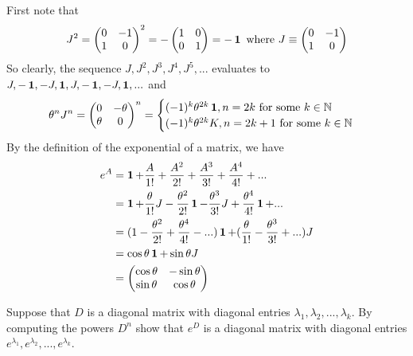 \documentclass[11pt,onecolumn]{article}
\begin{document}
\begin{answer}
First note that 
$$ J^2 = \begin{pmatrix} 0 & -1 \\ 1 & 0  \end{pmatrix}^2 = - \begin{pmatrix} 1 & 0 \\ 0 & 1 \end{pmatrix} = -\operatorname{\mathbf{1}} \text{ where } J \equiv \begin{pmatrix} 0 & -1 \\ 1 & 0 \end{pmatrix} $$
So clearly, the sequence $J,J^2,J^3,J^4,J^5,...$ evaluates to $J, -\operatorname{\mathbf{1}}, -J, \operatorname{\mathbf{1}}, J, -\operatorname{\mathbf{1}}, -J, \operatorname{\mathbf{1}},...$ and $$ \theta^n J^n = \begin{pmatrix} 0 & -\theta \\ \theta & 0 \end{pmatrix}^n = \begin{cases} (-1)^k\theta^{2k} \operatorname{\mathbf{1}}, n = 2k \text{ for some } k\in \mathbb{N} \\ (-1)^k\theta^{2k} K, n=2k+1 \text{ for some } k \in \mathbb{N}
\end{cases}$$
By the definition of the exponential of a matrix, we have
\begin{align*}
    e^A &= \operatorname{\mathbf{1}} + \frac{A}{1!} + \frac{A^2}{2!} + \frac{A^3}{3!} + \frac{A^4}{4!} + ... \\
    &= \operatorname{\mathbf{1}} + \frac{\theta}{1!}J -  \frac{\theta^2}{2!}\operatorname{\mathbf{1}} - \frac{\theta^3}{3!}J + \frac{\theta^4}{4!} \operatorname{\mathbf{1}} + ...\\
    &= (1 - \frac{\theta^2}{2!} + \frac{\theta^4}{4!} - ...)\operatorname{\mathbf{1}} + (\frac{\theta}{1!} - \frac{\theta^3}{3!} + ...)J \\
    &= \cos{\theta} \operatorname{\mathbf{1}} + \sin{\theta} J \\
    &= \begin{pmatrix} \cos{\theta} & -\sin{\theta} \\ \sin{\theta} & \cos{\theta} \end{pmatrix}
\end{align*}
\end{answer}
\begin{exercise}
 Suppose that $D$ is a diagonal matrix with diagonal entries
$\lambda_1,\lambda_2,..., \lambda_k$. By computing the powers $D^n$ show that $e^D$ is a diagonal matrix with diagonal entries $e^{\lambda_1},e^{\lambda_2},...,e^{\lambda_k}$.
\end{exercise}
\end{document}
